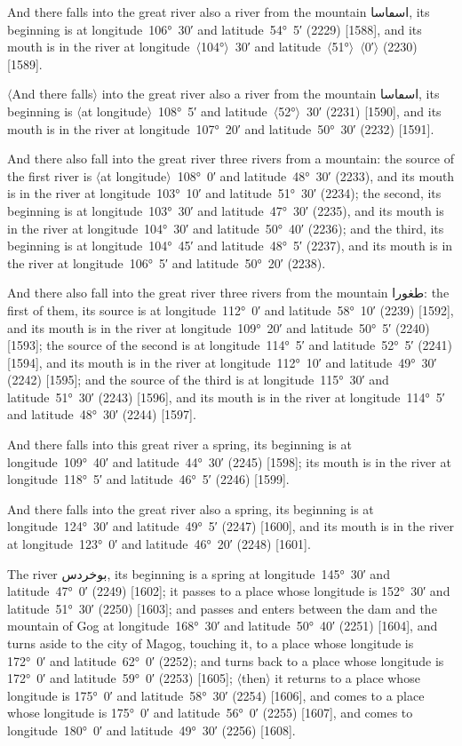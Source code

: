 \documentclass[11pt]{article}
\newcommand{\Pg}[1]{\marginpar{\footnotesize #1}}
\newcommand{\Ang}[1]{\ensuremath{#1}}
\begin{document}
And there falls into the great river also a river from the mountain \textarabic{اسڡاسا}, its beginning is at longitude~106°~30′ and latitude~54°~5′ (2229) [1588], and its mouth is in the river at longitude~\Ang{\langle}104°\Ang{\rangle}~30′ and latitude~\Ang{\langle}51°\Ang{\rangle}~\Ang{\langle}0′\Ang{\rangle} (2230) [1589].

\Ang{\langle}And there falls\Ang{\rangle} into the great river also a river from the mountain \textarabic{اسڡاسا}, its beginning is \Ang{\langle}at longitude\Ang{\rangle}~108°~5′ and latitude~\Ang{\langle}52°\Ang{\rangle}~30′ (2231) [1590], and its mouth is in the river at longitude~107°~20′ and latitude~50°~30′ (2232) [1591]\Pg{p. 148}.

And there also fall into the great river three rivers from a mountain: the source of the first river is \Ang{\langle}at longitude\Ang{\rangle}~108°~0′ and latitude~48°~30′ (2233), and its mouth is in the river at longitude~103°~10′ and latitude~51°~30′ (2234); the second, its beginning is at longitude~103°~30′ and latitude~47°~30′ (2235), and its mouth is in the river at longitude~104°~30′ and latitude~50°~40′ (2236); and the third, its beginning is at longitude~104°~45′ and latitude~48°~5′ (2237), and its mouth is in the river at longitude~106°~5′ and latitude~50°~20′ (2238).

And there also fall into the great river three rivers from the mountain \textarabic{طغورا}: the first of them, its source is at longitude~112°~0′ and latitude~58°~10′ (2239) [1592], and its mouth is in the river at longitude~109°~20′ and latitude~50°~5′ (2240) [1593]; the source of the second is at longitude~114°~5′ and latitude~52°~5′ (2241) [1594], and its mouth is in the river at longitude~112°~10′ and latitude~49°~30′ (2242) [1595]; and the source of the third is at longitude~115°~30′ and latitude~51°~30′ (2243) [1596], and its mouth is in the river at longitude~114°~5′ and latitude~48°~30′ (2244) [1597].

And there falls into this great river a spring, its beginning is at longitude~109°~40′ and latitude~44°~30′ (2245) [1598]; its mouth is in the river at longitude~118°~5′ and latitude~46°~5′ (2246) [1599].

And there falls into the great river also a spring, its beginning is at longitude~124°~30′ and latitude~49°~5′ (2247) [1600], and its mouth is in the river at longitude~123°~0′ and latitude~46°~20′ (2248) [1601].

The river \textarabic{بوخردس}, its beginning is a spring at longitude~145°~30′ and latitude~47°~0′ (2249) [1602]\Pg{p. 149}; it passes to a place whose longitude is 152°~30′ and latitude~51°~30′ (2250) [1603]; and passes and enters between the dam and the mountain of Gog at longitude~168°~30′ and latitude~50°~40′ (2251) [1604], and turns aside to the city of Magog, touching it, to a place whose longitude is 172°~0′ and latitude~62°~0′ (2252); and turns back to a place whose longitude is 172°~0′ and latitude~59°~0′ (2253) [1605]; \Ang{\langle}then\Ang{\rangle} it returns to a place whose longitude is 175°~0′ and latitude~58°~30′ (2254) [1606], and comes to a place whose longitude is 175°~0′ and latitude~56°~0′ (2255) [1607], and comes to longitude~180°~0′ and latitude~49°~30′ (2256) [1608].
\end{document}
